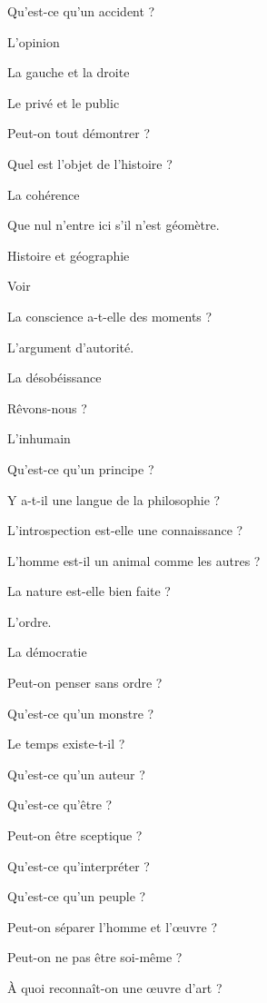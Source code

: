 \documentclass[a4paper,12pt]{article}
\begin{document}
\begin{multicols}{2}
\noindent Qu’est-ce qu’un accident ? \par
\noindent L’opinion \par
\noindent La gauche et la droite \par
\noindent Le privé et le public \par
\noindent Peut-on tout démontrer ? \par
\noindent Quel est l’objet de l’histoire ? \par
\noindent La cohérence \par
\noindent Que nul n’entre ici s’il n’est géomètre. \par
\noindent Histoire et géographie \par
\noindent Voir \par
\noindent La conscience a-t-elle des moments ? \par
\noindent L’argument d’autorité. \par
\noindent La désobéissance \par
\noindent Rêvons-nous ? \par
\noindent L’inhumain \par
\noindent Qu’est-ce qu’un principe ? \par
\noindent Y a-t-il une langue de la philosophie ? \par
\noindent L’introspection est-elle une connaissance ? \par
\noindent L’homme est-il un animal comme les autres ? \par
\noindent La nature est-elle bien faite ? \par
\noindent L’ordre. \par
\noindent La démocratie \par
\noindent Peut-on penser sans ordre ? \par
\noindent Qu’est-ce qu’un monstre ? \par
\noindent Le temps existe-t-il ? \par
\noindent Qu’est-ce qu’un auteur ? \par
\noindent Qu’est-ce qu’être ? \par
\noindent Peut-on être sceptique ? \par
\noindent Qu’est-ce qu’interpréter ? \par
\noindent Qu’est-ce qu’un peuple ? \par
\noindent Peut-on séparer l’homme et l’œuvre ? \par
\noindent Peut-on ne pas être soi-même ? \par
\noindent À quoi reconnaît-on une œuvre d’art ? \par

\end{multicols}
\end{document}
